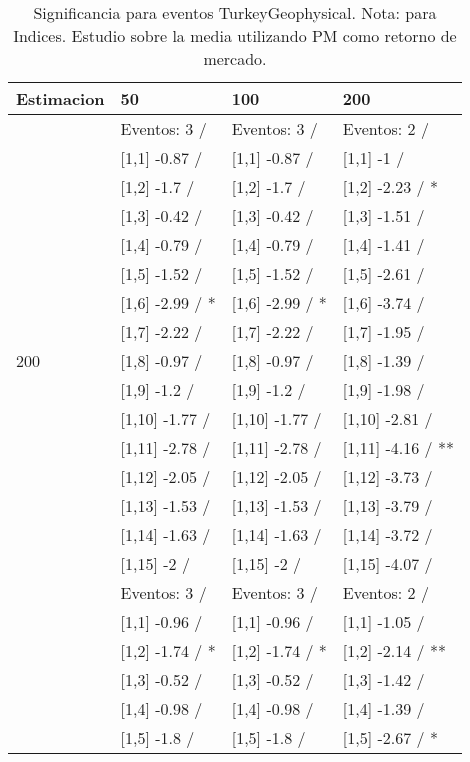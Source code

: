\begin{table}

\caption{Significancia para eventos TurkeyGeophysical. Nota: para Indices. Estudio sobre la media utilizando PM como retorno de mercado.}
\centering
\begin{tabular}[t]{llll}
\toprule
Estimacion & 50 & 100 & 200\\
\midrule
 & Eventos:  3 / & Eventos:  3 / & Eventos:  2 /\\
 & {}[1,1] -0.87  / & {}[1,1] -0.87  / & {}[1,1] -1  /\\
 & {}[1,2] -1.7  / & {}[1,2] -1.7  / & {}[1,2] -2.23  / *\\
 & {}[1,3] -0.42  / & {}[1,3] -0.42  / & {}[1,3] -1.51  /\\
 & {}[1,4] -0.79  / & {}[1,4] -0.79  / & {}[1,4] -1.41  /\\
\addlinespace
 & {}[1,5] -1.52  / & {}[1,5] -1.52  / & {}[1,5] -2.61  /\\
 & {}[1,6] -2.99  / * & {}[1,6] -2.99  / * & {}[1,6] -3.74  /\\
 & {}[1,7] -2.22  / & {}[1,7] -2.22  / & {}[1,7] -1.95  /\\
200 & {}[1,8] -0.97  / & {}[1,8] -0.97  / & {}[1,8] -1.39  /\\
 & {}[1,9] -1.2  / & {}[1,9] -1.2  / & {}[1,9] -1.98  /\\
\addlinespace
 & {}[1,10] -1.77  / & {}[1,10] -1.77  / & {}[1,10] -2.81  /\\
 & {}[1,11] -2.78  / & {}[1,11] -2.78  / & {}[1,11] -4.16  / **\\
 & {}[1,12] -2.05  / & {}[1,12] -2.05  / & {}[1,12] -3.73  /\\
 & {}[1,13] -1.53  / & {}[1,13] -1.53  / & {}[1,13] -3.79  /\\
 & {}[1,14] -1.63  / & {}[1,14] -1.63  / & {}[1,14] -3.72  /\\
\addlinespace
 & {}[1,15] -2  / & {}[1,15] -2  / & {}[1,15] -4.07  /\\
 & Eventos:  3 / & Eventos:  3 / & Eventos:  2 /\\
 & {}[1,1] -0.96  / & {}[1,1] -0.96  / & {}[1,1] -1.05  /\\
 & {}[1,2] -1.74  / * & {}[1,2] -1.74  / * & {}[1,2] -2.14  / **\\
 & {}[1,3] -0.52  / & {}[1,3] -0.52  / & {}[1,3] -1.42  /\\
\addlinespace
 & {}[1,4] -0.98  / & {}[1,4] -0.98  / & {}[1,4] -1.39  /\\
 & {}[1,5] -1.8  / & {}[1,5] -1.8  / & {}[1,5] -2.67  / *\\

\end{tabular}
\end{table}
